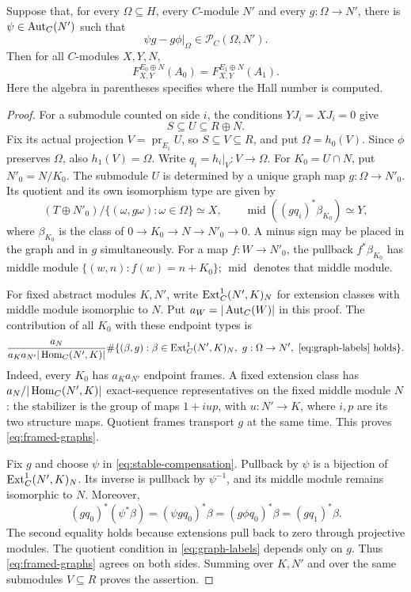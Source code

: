 \begin{lemma}\label{lem:graph-comparison}
Suppose that, for every $\Omega\subseteq H$, every $C$-module $N'$ and every $g:\Omega\to N'$, there is $\psi\in\operatorname{Aut}_C(N')$ such that
\begin{equation}\label{eq:stable-compensation}
 \psi g-g\phi|_\Omega\in\mathcal P_C(\Omega,N').
\end{equation}
Then for all $C$-modules $X,Y,N$,
\[
 F^{E_0\oplus N}_{X,Y}(A_0)=F^{E_1\oplus N}_{X,Y}(A_1).
\]
Here the algebra in parentheses specifies where the Hall number is computed.
\end{lemma}
\begin{proof}
For a submodule counted on side $i$, the conditions $YJ_i=XJ_i=0$ give
\[
 S\subseteq U\subseteq R\oplus N.
\]
Fix its actual projection $V=\operatorname{pr}_{E_i}U$, so $S\subseteq V\subseteq R$, and put $\Omega=h_0(V)$. Since $\phi$ preserves $\Omega$, also $h_1(V)=\Omega$. Write $q_i=h_i|_V:V\to\Omega$. For $K_0=U\cap N$, put $N'_0=N/K_0$. The submodule $U$ is determined by a unique graph map $g:\Omega\to N'_0$. Its quotient and its own isomorphism type are given by
\begin{equation}\label{eq:graph-labels}
 (T\oplus N'_0)/\{(\omega,g\omega):\omega\in\Omega\}\simeq X,
 \qquad \operatorname{mid}((gq_i)^*\beta_{K_0})\simeq Y,
\end{equation}
where $\beta_{K_0}$ is the class of $0\to K_0\to N\to N'_0\to0$. A minus sign may be placed in the graph and in $g$ simultaneously. For a map $f:W\to N'_0$, the pullback $f^*\beta_{K_0}$ has middle module
$\{(w,n):f(w)=n+K_0\}$; $\operatorname{mid}$ denotes that middle module.

For fixed abstract modules $K,N'$, write $\operatorname{Ext}_C^1(N',K)_N$ for extension classes with middle module isomorphic to $N$. Put $a_W=|\operatorname{Aut}_C(W)|$ in this proof. The contribution of all $K_0$ with these endpoint types is
\begin{equation}\label{eq:framed-graphs}
 \frac{a_N}{a_Ka_{N'}|\operatorname{Hom}_C(N',K)|}
 \#\{(\beta,g):\beta\in\operatorname{Ext}_C^1(N',K)_N,\ g:\Omega\to N',
                  \ \eqref{eq:graph-labels}\text{ holds}\}.
\end{equation}
Indeed, every $K_0$ has $a_Ka_{N'}$ endpoint frames. A fixed extension class has $a_N/|\operatorname{Hom}_C(N',K)|$ exact-sequence representatives on the fixed middle module $N$: the stabilizer is the group of maps $1+iup$, with $u:N'\to K$, where $i,p$ are its two structure maps. Quotient frames transport $g$ at the same time. This proves \eqref{eq:framed-graphs}.

Fix $g$ and choose $\psi$ in \eqref{eq:stable-compensation}. Pullback by $\psi$ is a bijection of $\operatorname{Ext}_C^1(N',K)_N$. Its inverse is pullback by $\psi^{-1}$, and its middle module remains isomorphic to $N$. Moreover,
\[
 (gq_0)^*(\psi^*\beta)=(\psi gq_0)^*\beta
       =(g\phi q_0)^*\beta=(gq_1)^*\beta.
\]
The second equality holds because extensions pull back to zero through projective modules. The quotient condition in \eqref{eq:graph-labels} depends only on $g$. Thus \eqref{eq:framed-graphs} agrees on both sides. Summing over $K,N'$ and over the same submodules $V\subseteq R$ proves the assertion.
\end{proof}

